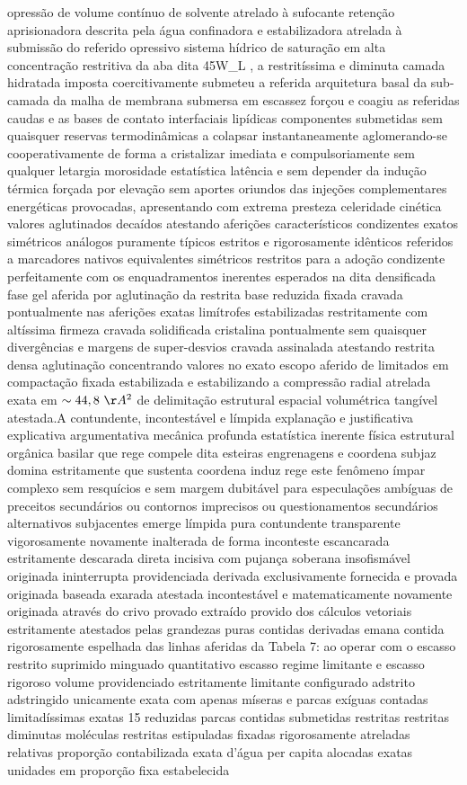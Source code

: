 opressão de volume contínuo de solvente atrelado à sufocante retenção aprisionadora descrita pela água confinadora e estabilizadora atrelada à submissão do referido opressivo sistema hídrico de saturação em alta concentração restritiva da aba dita 45W\_L , a restritíssima e diminuta camada hidratada imposta coercitivamente submeteu a referida arquitetura basal da sub-camada da malha de membrana submersa em escassez forçou e coagiu as referidas caudas e as bases de contato interfaciais lipídicas componentes submetidas sem quaisquer reservas termodinâmicas a colapsar instantaneamente aglomerando-se cooperativamente de forma a cristalizar imediata e compulsoriamente sem qualquer letargia morosidade estatística latência e sem depender da indução térmica forçada por elevação sem aportes oriundos das injeções complementares energéticas provocadas, apresentando com extrema presteza celeridade cinética valores aglutinados decaídos atestando aferições característicos condizentes exatos simétricos análogos puramente típicos estritos e rigorosamente idênticos referidos a marcadores nativos equivalentes simétricos restritos para a adoção condizente perfeitamente com os enquadramentos inerentes esperados na dita densificada fase gel aferida por aglutinação da restrita base reduzida fixada cravada pontualmente nas aferições exatas limítrofes estabilizadas restritamente com altíssima firmeza cravada solidificada cristalina pontualmente sem quaisquer divergências e margens de super-desvios cravada assinalada atestando restrita densa aglutinação concentrando valores no exato escopo aferido de limitados em compactação fixada estabilizada e estabilizando a compressão radial atrelada exata em $\sim44,8~\AA^2$ de delimitação estrutural espacial volumétrica tangível atestada.A contundente, incontestável e límpida explanação e justificativa explicativa argumentativa mecânica profunda estatística inerente física estrutural orgânica basilar que rege compele dita esteiras engrenagens e coordena subjaz domina estritamente que sustenta coordena induz rege este fenômeno ímpar complexo sem resquícios e sem margem dubitável para especulações ambíguas de preceitos secundários ou contornos imprecisos ou questionamentos secundários alternativos subjacentes emerge límpida pura contundente transparente vigorosamente novamente inalterada de forma inconteste escancarada estritamente descarada direta incisiva com pujança soberana insofismável originada ininterrupta providenciada derivada exclusivamente fornecida e provada originada baseada exarada atestada incontestável e matematicamente novamente originada através do crivo provado extraído provido dos cálculos vetoriais estritamente atestados pelas grandezas puras contidas derivadas emana contida rigorosamente espelhada das linhas aferidas da Tabela 7: ao operar com o escasso restrito suprimido minguado quantitativo escasso regime limitante e escasso rigoroso volume providenciado estritamente limitante configurado adstrito adstringido unicamente exata com apenas míseras e parcas exíguas contadas limitadíssimas exatas 15 reduzidas parcas contidas submetidas restritas restritas diminutas moléculas restritas estipuladas fixadas rigorosamente atreladas relativas proporção contabilizada exata d'água per capita alocadas exatas unidades em proporção fixa estabelecida 